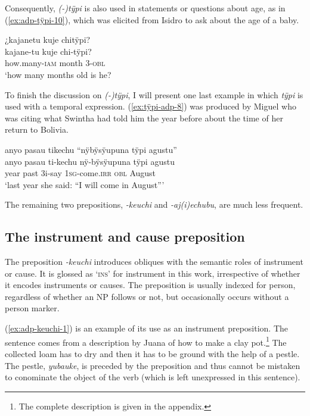 Consequently, \textit{(-)tÿpi} is also used in statements or questions about age, as in (\ref{ex:adp-tÿpi-10}), which was elicited from Isidro to ask about the age of a baby.

\ea\label{ex:adp-tÿpi-10}
\begingl
\glpreamble ¿kajanetu kuje chitÿpi?\\
\gla kajane-tu kuje chi-tÿpi?\\
\glb how.many-\textsc{iam} month 3-\textsc{obl}\\
\glft ‘how many months old is he?
\endgl
\trailingcitation{[dxx-d120416s.071]}
\xe

To finish the discussion on \textit{(-)tÿpi}, I will present one last example in which \textit{tÿpi} is used with a temporal expression. (\ref{ex:tÿpi-adp-8}) was produced by Miguel who was citing what Swintha had told him the year before about the time of her return to Bolivia.

\ea\label{ex:tÿpi-adp-8}
\begingl
\glpreamble anyo pasau tikechu “nÿbÿsÿupuna tÿpi agustu”\\
\gla anyo pasau ti-kechu nÿ-bÿsÿupuna tÿpi agustu\\
\glb year past 3i-say 1\textsc{sg}-come.\textsc{irr} \textsc{obl} August\\
\glft ‘last year she said: “I will come in August”’
\endgl
\trailingcitation{[mxx-d110813s-2.057]}
\xe


The remaining two prepositions, \textit{-keuchi} and \textit{-aj(i)echubu}, are much less frequent.

\subsection{The instrument and cause preposition}\label{sec:adp-keuchi}

The preposition \textit{-keuchi} introduces obliques with the semantic roles of instrument or cause. It is glossed as ‘\textsc{ins}’ for instrument in this work, irrespective of whether it encodes instruments or causes. The preposition is usually indexed for person, regardless of whether an NP follows or not, but occasionally occurs without a person marker. 

(\ref{ex:adp-keuchi-1}) is an example of its use as an instrument preposition. The sentence comes from a description by Juana of how to make a clay pot.\footnote{The complete description is given in the appendix.} The collected loam has to dry and then it has to be ground with the help of a pestle. The pestle, \textit{yubauke}, is preceded by the preposition and thus cannot be mistaken to conominate the object of the verb (which is left unexpressed in this sentence).

